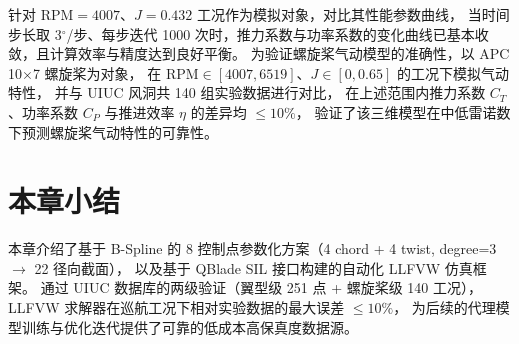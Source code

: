针对 $\text{RPM} = 4007$、$J = 0.432$ 工况作为模拟对象，对比其性能参数曲线，
当时间步长取 3$^\circ$/步、每步迭代 1000 次时，推力系数与功率系数的变化曲线已基本收敛，且计算效率与精度达到良好平衡。
为验证螺旋桨气动模型的准确性，以 APC 10$\times$7 螺旋桨为对象，
在 $\text{RPM} \in [4007, 6519]$、$J \in [0, 0.65]$ 的工况下模拟气动特性，
并与 UIUC 风洞共 140 组实验数据进行对比，
在上述范围内推力系数 $C_T$、功率系数 $C_P$ 与推进效率 $\eta$ 的差异均 $\leq 10\%$，
验证了该三维模型在中低雷诺数下预测螺旋桨气动特性的可靠性。

\section{本章小结}

本章介绍了基于 B-Spline 的 8 控制点参数化方案（4 chord + 4 twist, degree=3 $\to$ 22 径向截面），
以及基于 QBlade SIL 接口构建的自动化 LLFVW 仿真框架。
通过 UIUC 数据库的两级验证（翼型级 251 点 + 螺旋桨级 140 工况），
LLFVW 求解器在巡航工况下相对实验数据的最大误差 $\leq 10\%$，
为后续的代理模型训练与优化迭代提供了可靠的低成本高保真度数据源。
